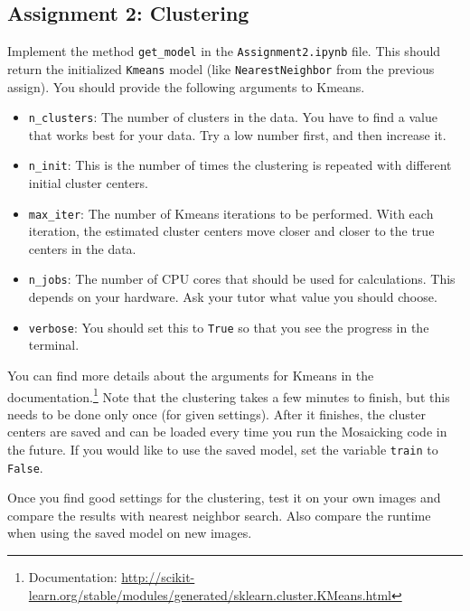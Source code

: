 \documentclass[a4paper]{article}
\begin{document}
	\subsection{Assignment 2: Clustering}
		Implement the method \verb|get_model| in the \verb|Assignment2.ipynb| file.
		This should return the initialized \verb|Kmeans| model (like \verb|NearestNeighbor| from the previous assign).
		You should provide the following arguments to Kmeans.
		\begin{itemize}
			\item \verb|n_clusters|: The number of clusters in the data. 
			You have to find a value that works best for your data. 
			Try a low number first, and then increase it.
			\item \verb|n_init|: This is the number of times the clustering is repeated with different initial cluster centers.
			\item \verb|max_iter|: The number of Kmeans iterations to be performed. 
			With each iteration, the estimated cluster centers move closer and closer to the true centers in the data.
			\item \verb|n_jobs|: The number of CPU cores that should be used for calculations. 
			This depends on your hardware. 
			Ask your tutor what value you should choose.
			\item \verb|verbose|: You should set this to \verb|True| so that you see the progress in the terminal.
		\end{itemize}
		You can find more details about the arguments for Kmeans in the documentation.\footnote{
			Documentation: \url{http://scikit-learn.org/stable/modules/generated/sklearn.cluster.KMeans.html}
		}
		Note that the clustering takes a few minutes to finish, but this needs to be done only once (for given settings).
		After it finishes, the cluster centers are saved and can be loaded every time you run the Mosaicking code in the future.
		If you would like to use the saved model, set the variable \verb|train| to \verb|False|.
		
		Once you find good settings for the clustering, test it on your own images and compare the results with nearest neighbor search.
		Also compare the runtime when using the saved model on new images.
		
\end{document}
